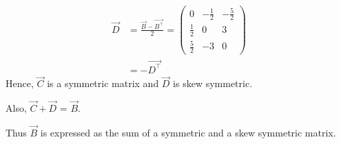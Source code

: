 \documentclass[journal,12pt,twocolumn]{IEEEtran}
\begin{document}
\begin{align}
\vec{D} &=\frac{\vec{B} - \vec{B^\top}}{2} =
\begin{pmatrix} 
0 & -\frac{1}{2} & -\frac{5}{2} \\  \frac{1}{2} & 0 & 3 \\ \frac{5}{2}&-3&0
\end{pmatrix}\\
&= -\vec{D^\top}
\label{eq2}
\end{align}
Hence, $\vec{C}$ is a symmetric matrix and $\vec{D}$ is skew symmetric.

Also, $\vec{C} + \vec{D}$ = $\vec{B}$.

Thus $\vec{B}$ is expressed as the sum of a symmetric and a skew symmetric matrix.
\end{document}

